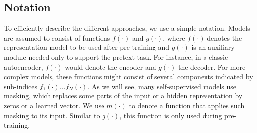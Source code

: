 


\subsection{Notation}
\label{sec:notation}

To efficiently describe the different approaches, we use a simple
notation. Models are assumed to consist of functions $f(\cdot)$ and $g(\cdot)$, where $f(\cdot)$  denotes the representation model to be used after pre-training and $g(\cdot)$ is an auxiliary module needed only to support the pretext task. For instance, in a classic autoencoder, $f(\cdot)$ would denote the encoder and $g(\cdot)$ the decoder. For more complex models, these functions might consist of several components indicated by sub-indices $f_1(\cdot) \dots f_N(\cdot)$. As we will see, many self-supervised models use masking, which replaces some parts of the input or a hidden representation  by zeros or a learned vector. We use $m(\cdot)$ to denote a function that applies such masking to its input. Similar to $g(\cdot)$, this function is only used during pre-training. 

